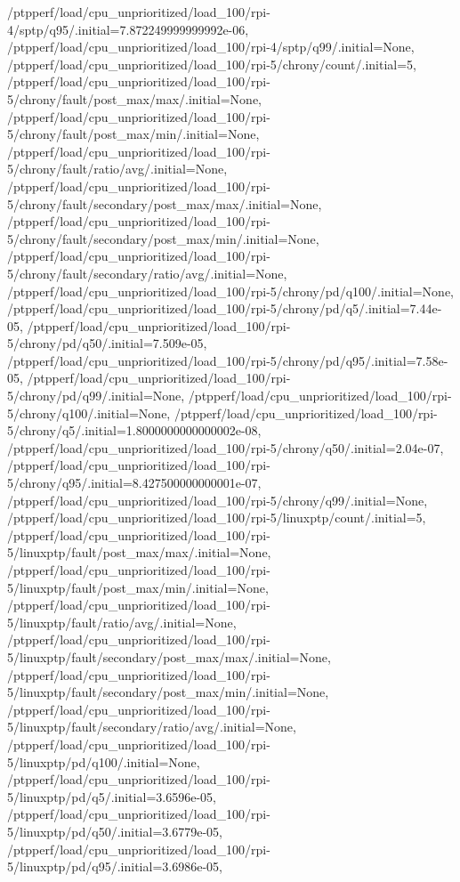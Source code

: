 {    /ptpperf/load/cpu_unprioritized/load_100/rpi-4/sptp/q95/.initial=7.872249999999992e-06,
    /ptpperf/load/cpu_unprioritized/load_100/rpi-4/sptp/q99/.initial=None,
    /ptpperf/load/cpu_unprioritized/load_100/rpi-5/chrony/count/.initial=5,
    /ptpperf/load/cpu_unprioritized/load_100/rpi-5/chrony/fault/post_max/max/.initial=None,
    /ptpperf/load/cpu_unprioritized/load_100/rpi-5/chrony/fault/post_max/min/.initial=None,
    /ptpperf/load/cpu_unprioritized/load_100/rpi-5/chrony/fault/ratio/avg/.initial=None,
    /ptpperf/load/cpu_unprioritized/load_100/rpi-5/chrony/fault/secondary/post_max/max/.initial=None,
    /ptpperf/load/cpu_unprioritized/load_100/rpi-5/chrony/fault/secondary/post_max/min/.initial=None,
    /ptpperf/load/cpu_unprioritized/load_100/rpi-5/chrony/fault/secondary/ratio/avg/.initial=None,
    /ptpperf/load/cpu_unprioritized/load_100/rpi-5/chrony/pd/q100/.initial=None,
    /ptpperf/load/cpu_unprioritized/load_100/rpi-5/chrony/pd/q5/.initial=7.44e-05,
    /ptpperf/load/cpu_unprioritized/load_100/rpi-5/chrony/pd/q50/.initial=7.509e-05,
    /ptpperf/load/cpu_unprioritized/load_100/rpi-5/chrony/pd/q95/.initial=7.58e-05,
    /ptpperf/load/cpu_unprioritized/load_100/rpi-5/chrony/pd/q99/.initial=None,
    /ptpperf/load/cpu_unprioritized/load_100/rpi-5/chrony/q100/.initial=None,
    /ptpperf/load/cpu_unprioritized/load_100/rpi-5/chrony/q5/.initial=1.8000000000000002e-08,
    /ptpperf/load/cpu_unprioritized/load_100/rpi-5/chrony/q50/.initial=2.04e-07,
    /ptpperf/load/cpu_unprioritized/load_100/rpi-5/chrony/q95/.initial=8.427500000000001e-07,
    /ptpperf/load/cpu_unprioritized/load_100/rpi-5/chrony/q99/.initial=None,
    /ptpperf/load/cpu_unprioritized/load_100/rpi-5/linuxptp/count/.initial=5,
    /ptpperf/load/cpu_unprioritized/load_100/rpi-5/linuxptp/fault/post_max/max/.initial=None,
    /ptpperf/load/cpu_unprioritized/load_100/rpi-5/linuxptp/fault/post_max/min/.initial=None,
    /ptpperf/load/cpu_unprioritized/load_100/rpi-5/linuxptp/fault/ratio/avg/.initial=None,
    /ptpperf/load/cpu_unprioritized/load_100/rpi-5/linuxptp/fault/secondary/post_max/max/.initial=None,
    /ptpperf/load/cpu_unprioritized/load_100/rpi-5/linuxptp/fault/secondary/post_max/min/.initial=None,
    /ptpperf/load/cpu_unprioritized/load_100/rpi-5/linuxptp/fault/secondary/ratio/avg/.initial=None,
    /ptpperf/load/cpu_unprioritized/load_100/rpi-5/linuxptp/pd/q100/.initial=None,
    /ptpperf/load/cpu_unprioritized/load_100/rpi-5/linuxptp/pd/q5/.initial=3.6596e-05,
    /ptpperf/load/cpu_unprioritized/load_100/rpi-5/linuxptp/pd/q50/.initial=3.6779e-05,
    /ptpperf/load/cpu_unprioritized/load_100/rpi-5/linuxptp/pd/q95/.initial=3.6986e-05,
}
